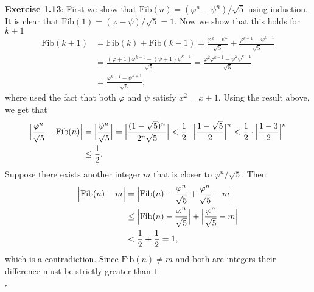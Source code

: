 \documentclass[11pt]{article}
\date{\today}
\title{}
\begin{document}
\noindent\textbf{Exercise 1.13}: First we show that \(\mathrm{Fib}(n) = ({\varphi^n - \psi^n})/\sqrt{5}\) using induction. It is clear that
\(\mathrm{Fib}(1) = (\varphi-\psi)/\sqrt{5} = 1\). Now we show that this holds for \(k+1\)
\begin{align*}
        \mathrm{Fib}(k+1) &= \mathrm{Fib}(k) + \mathrm{Fib}(k-1)
        = \frac{\varphi^{k} - \psi^{k}}{\sqrt{5}} + \frac{\varphi^{k-1} - \psi^{k-1}}{\sqrt{5}}     \\
        &= \frac{ (\varphi+1)\varphi^{k-1} - (\psi+1)\psi^{k-1} }{ \sqrt{5} }
        = \frac{ \varphi^2\varphi^{k-1} - \psi^2\psi^{k-1} }{ \sqrt{5} } \\
        &= \frac{ \varphi^{k+1} - \psi^{k+1} }{ \sqrt{5} },
\end{align*}
where used the fact that both \(\varphi\) and \(\psi\) satisfy \(x^2=x+1\). Using the result above,
we get that
\begin{align*}
        \Bigl| \frac{ \varphi^n } {\sqrt{5}} - \mathrm{ Fib }(n) \Bigr| &=
        \Bigl| \frac{ \psi^n } {\sqrt{5}} \Bigr| =
        \Bigl| \frac{ (1-\sqrt{5})^n } {2^n\sqrt{5}} \Bigr| <
        \frac{1}{2} \cdot \Bigl| {\frac{ 1-\sqrt{5} } {2}} \Bigr|^n
        < \frac{1}{2} \cdot \Bigl| {\frac{ 1-3 } {2}} \Bigr|^n \\
        & \leq \frac{1}{2}.
\end{align*}
Suppose there exists another integer \(m\) that is closer to \(\varphi^n / \sqrt{5}\). Then
\begin{align*}
        \Bigl| \mathrm{Fib}(n) - m \Bigr| &= \Bigl| \mathrm{Fib}(n) - \frac{ \varphi^n } {\sqrt{5}}
        + \frac{ \varphi^n } {\sqrt{5}} - m \Bigr| \\
        & \leq \Bigl| \mathrm{Fib}(n) - \frac{ \varphi^n } {\sqrt{5}} \Bigr|
        + \Bigl| \frac{ \varphi^n } {\sqrt{5}} - m \Bigr| \\
        & < \frac{1}{2} + \frac{1}{2} = 1,
\end{align*}
which is a contradiction. Since \(\mathrm{Fib}(n) \neq m\) and both are integers their difference
must be strictly greater than \(1\).

\hfill\(\square\)
\end{document}
